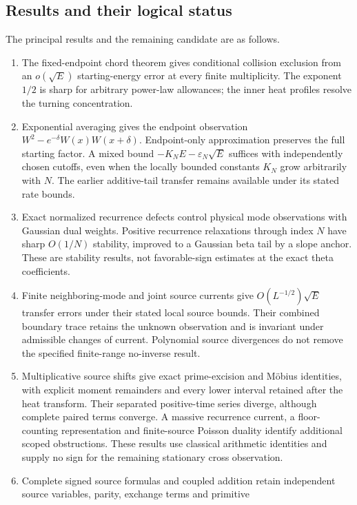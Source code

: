 \documentclass[11pt]{article}
\numberwithin{equation}{section}
\theoremstyle{definition}
\theoremstyle{remark}
\begin{document}
\subsection{Results and their logical status}
The principal results and the remaining candidate are as follows.
\begin{enumerate}[leftmargin=*,itemsep=3pt]
 \item The fixed-endpoint chord theorem gives conditional collision
 exclusion from an $o(\sqrt E)$ starting-energy error at every finite
 multiplicity. The exponent $1/2$ is sharp for arbitrary power-law
 allowances; the inner heat profiles resolve the turning concentration.
 \item Exponential averaging gives the endpoint observation
 $W^2-e^{-\delta}W(x)W(x+\delta)$. Endpoint-only approximation preserves
 the full starting factor. A mixed bound $-K_NE-\varepsilon_N\sqrt E$
 suffices with independently chosen cutoffs, even when the locally
 bounded constants $K_N$ grow arbitrarily with $N$. The earlier
 additive-tail transfer remains available under its stated rate bounds.
 \item Exact normalized recurrence defects control physical mode
 observations with Gaussian dual weights. Positive recurrence
 relaxations through index $N$ have sharp $O(1/N)$ stability, improved
 to a Gaussian beta tail by a slope anchor. These are stability results,
 not favorable-sign estimates at the exact theta coefficients.
 \item Finite neighboring-mode and joint source currents give
 $O(L^{-1/2})\sqrt E$ transfer errors under their stated local source
 bounds. Their combined boundary trace retains the unknown observation
 and is invariant under admissible changes of current. Polynomial source
 divergences do not remove the specified finite-range no-inverse result.
 \item Multiplicative source shifts give exact prime-excision and
 M\"obius identities, with explicit moment remainders and every lower
 interval retained after the heat transform. Their separated
 positive-time series diverge, although complete paired terms converge.
 A massive recurrence current, a floor-counting representation and
 finite-source Poisson duality identify additional scoped obstructions.
 These results use classical arithmetic identities and supply no sign
 for the remaining stationary cross observation.
 \item Complete signed source formulas and coupled addition retain
 independent source variables, parity, exchange terms and primitive

\end{enumerate}
\end{document}
